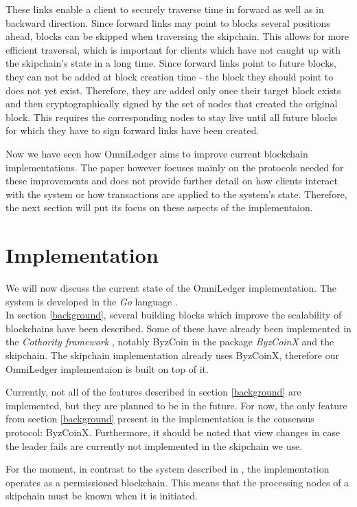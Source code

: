 \documentclass[11pt, a4paper, twoside, openright]{article} %
\begin{document}
These links enable a client to securely traverse time in forward as well as
in backward direction. Since forward links may point to blocks several
positions ahead, blocks can be skipped when traversing the skipchain.
This allows for more efficient traversal, which is important for clients which
have not caught up with the skipchain's state in a long time.
Since forward links point to future blocks, they can not be added at block
creation time - the block they should point to does not yet exist.
Therefore, they are added only once their target block exists and then 
cryptographically signed by the set of nodes that created the original block.
This requires the corresponding nodes to stay live until all future blocks
for which they have to sign forward links have been created.

Now we have seen how OmniLedger aims to improve current blockchain
implementations. The paper however focuses mainly on the protocols needed for
these improvements and does not provide further detail on how clients interact
with the system or how transactions are applied to the system's state.
Therefore, the next section will put its focus on these aspects of the
implementaion.


\section{Implementation} \label{implementation}
We will now discuss the current state of the OmniLedger implementation.
The system is developed in the \textit{Go} language \cite{golang}.\\

In section \ref{background}, several building blocks which improve the
scalability of blockchains have been described. Some of these have already
been implemented in the \textit{Cothority framework} \cite{coth},
notably ByzCoin in the package \textit{ByzCoinX} and the skipchain. The
skipchain implementation already uses ByzCoinX, therefore our OmniLedger
implementaion is built on top of it.

Currently, not all of the features described in section \ref{background} are
implemented, but they are planned to be in the future.
For now, the only feature from section \ref{background} present in the
implementation is the consensus protocol: ByzCoinX.
Furthermore, it should be noted that view changes in case the leader fails are
currently not implemented in the skipchain we use.

For the moment, in contrast to the system described
in \cite{KokorisKogias2017OmniLedgerAS}, the implementation operates as a
permissioned blockchain. This means that the processing nodes of a skipchain
must be known when it is initiated.\\
\end{document}
